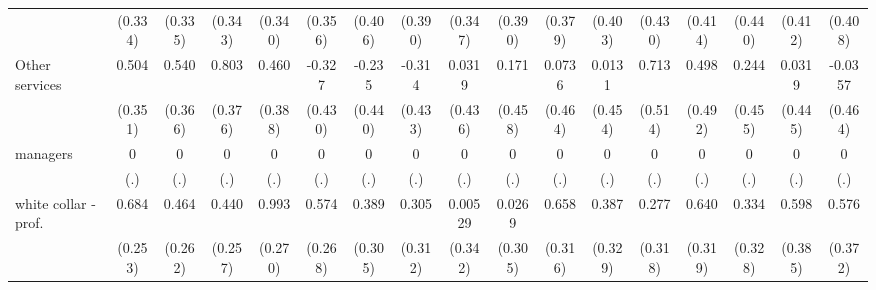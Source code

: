 {\begin{tabular}{l*{16}{c}}
                    &     (0.334)         &     (0.335)         &     (0.343)         &     (0.340)         &     (0.356)         &     (0.406)         &     (0.390)         &     (0.347)         &     (0.390)         &     (0.379)         &     (0.403)         &     (0.430)         &     (0.414)         &     (0.440)         &     (0.412)         &     (0.408)         \\
[1em]
Other services      &       0.504         &       0.540         &       0.803\sym{*}  &       0.460         &      -0.327         &      -0.235         &      -0.314         &      0.0319         &       0.171         &      0.0736         &      0.0131         &       0.713         &       0.498         &       0.244         &      0.0319         &     -0.0357         \\
                    &     (0.351)         &     (0.366)         &     (0.376)         &     (0.388)         &     (0.430)         &     (0.440)         &     (0.433)         &     (0.436)         &     (0.458)         &     (0.464)         &     (0.454)         &     (0.514)         &     (0.492)         &     (0.455)         &     (0.445)         &     (0.464)         \\
[1em]
managers            &           0         &           0         &           0         &           0         &           0         &           0         &           0         &           0         &           0         &           0         &           0         &           0         &           0         &           0         &           0         &           0         \\
                    &         (.)         &         (.)         &         (.)         &         (.)         &         (.)         &         (.)         &         (.)         &         (.)         &         (.)         &         (.)         &         (.)         &         (.)         &         (.)         &         (.)         &         (.)         &         (.)         \\
[1em]
white collar - prof.&       0.684\sym{**} &       0.464         &       0.440         &       0.993\sym{***}&       0.574\sym{*}  &       0.389         &       0.305         &     0.00529         &      0.0269         &       0.658\sym{*}  &       0.387         &       0.277         &       0.640\sym{*}  &       0.334         &       0.598         &       0.576         \\
                    &     (0.253)         &     (0.262)         &     (0.257)         &     (0.270)         &     (0.268)         &     (0.305)         &     (0.312)         &     (0.342)         &     (0.305)         &     (0.316)         &     (0.329)         &     (0.318)         &     (0.319)         &     (0.328)         &     (0.385)         &     (0.372)         \\

\end{tabular}}
